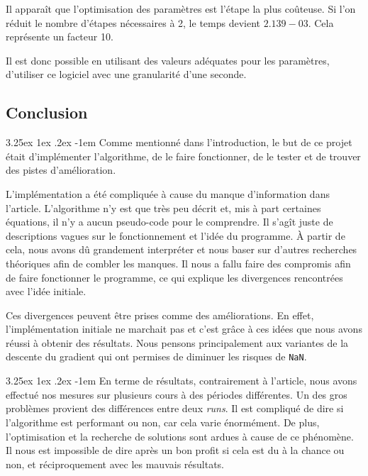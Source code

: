 \documentclass[a4paper, 11pt]{article}
\makeatletter
\renewcommand\paragraph{\@startsection{paragraph}{5}{\z@}%
  {3.25ex \@plus1ex \@minus.2ex}%
  {-1em}%
  {\normalfont\normalsize\bfseries}}
\makeatother
\begin{document}
Il apparaît que l'optimisation des paramètres est l'étape la plus coûteuse. Si l'on réduit le nombre d'étapes nécessaires à 2, le temps devient $2.139-03$. Cela représente un facteur 10.

Il est donc possible en utilisant des valeurs adéquates pour les paramètres, d'utiliser ce logiciel avec une granularité d'une seconde.
 
\subsection{Conclusion}
\paragraph{}
Comme mentionné dans l'introduction, le but de ce projet était d'implémenter l'algorithme, de le faire fonctionner, de le tester et de trouver des pistes
d'amélioration.

L'implémentation a été compliquée à cause du manque d'information dans l'article. L'algorithme n'y est que très peu décrit et, mis à part certaines 
équations, il n'y a aucun pseudo-code pour le comprendre. Il s'agît juste de descriptions vagues sur le fonctionnement et l'idée du programme. À partir de
cela, nous avons dû grandement interpréter et nous baser sur d'autres recherches théoriques afin de combler les manques. Il nous a fallu faire des compromis
afin de faire fonctionner le programme, ce qui explique les divergences rencontrées avec l'idée initiale.

Ces divergences peuvent être prises comme des améliorations. En effet, l'implémentation initiale ne marchait pas et c'est grâce à ces idées que nous avons
réussi à obtenir des résultats. Nous pensons principalement aux variantes de la descente du gradient qui ont permises de diminuer les risques de
\texttt{NaN}.

\paragraph{}
En terme de résultats, contrairement à l'article, nous avons effectué nos mesures sur plusieurs cours à des périodes différentes. Un des gros problèmes
provient des différences entre deux \textit{runs}. Il est compliqué de dire si l'algorithme est performant ou non, car cela varie énormément. De plus,
l'optimisation et la recherche de solutions sont ardues à cause de ce phénomène. Il nous est impossible de dire après un bon profit si cela est du à la
chance ou non, et réciproquement avec les mauvais résultats.
\end{document}
